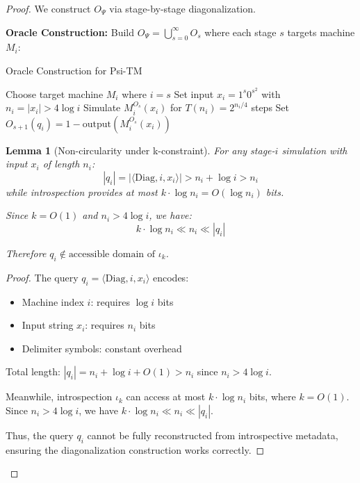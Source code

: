 \documentclass[11pt]{article}
\newtheorem{lemma}{Lemma}
\begin{document}
\begin{proof}
We construct $O_\Psi$ via stage-by-stage diagonalization.

\textbf{Oracle Construction:}
Build $O_\Psi = \bigcup_{s=0}^{\infty} O_s$ where each stage $s$ targets machine $M_i$:

\begin{algorithm}
\caption{Oracle Construction for Psi-TM}
\begin{algorithmic}[1]
    \STATE Choose target machine $M_i$ where $i = s$
    \STATE Set input $x_i = 1^s 0^{s^2}$ with $n_i = |x_i| > 4\log i$
    \STATE Simulate $M_i^{O_s}(x_i)$ for $T(n_i) = 2^{n_i/4}$ steps
        \STATE Set $O_{s+1}(q_i) = 1 - \text{output}(M_i^{O_s}(x_i))$
    \ENDIF
\ENDFOR
\end{algorithmic}
\end{algorithm}

\begin{lemma}[Non-circularity under k-constraint]
\label{lem:non-circularity}
For any stage-$i$ simulation with input $x_i$ of length $n_i$:
$$|q_i| = |\langle \text{Diag}, i, x_i \rangle| > n_i + \log i > n_i$$
while introspection provides at most $k \cdot \log n_i = O(\log n_i)$ bits.

Since $k = O(1)$ and $n_i > 4\log i$, we have:
$$k \cdot \log n_i \ll n_i \ll |q_i|$$

Therefore $q_i \notin \text{accessible domain of } \iota_k$.
\end{lemma}

\begin{proof}
The query $q_i = \langle \text{Diag}, i, x_i \rangle$ encodes:
\begin{itemize}
\item Machine index $i$: requires $\log i$ bits
\item Input string $x_i$: requires $n_i$ bits  
\item Delimiter symbols: constant overhead
\end{itemize}

Total length: $|q_i| = n_i + \log i + O(1) > n_i$ since $n_i > 4\log i$.

Meanwhile, introspection $\iota_k$ can access at most $k \cdot \log n_i$ bits, where $k = O(1)$. Since $n_i > 4\log i$, we have $k \cdot \log n_i \ll n_i \ll |q_i|$.

Thus, the query $q_i$ cannot be fully reconstructed from introspective metadata, ensuring the diagonalization construction works correctly.
\end{proof}


\end{proof}
\end{document}
